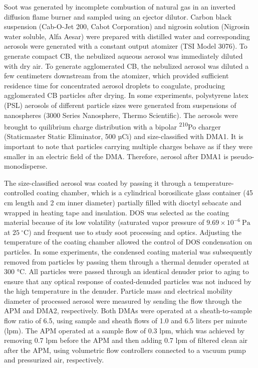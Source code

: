 Soot was generated by incomplete combustion of natural gas in an inverted diffusion flame burner \citep{RN43,RN44} and sampled using an ejector dilutor. Carbon black suspension (Cab-O-Jet 200, Cabot Corporation) and nigrosin solution (Nigrosin water soluble, Alfa Aesar) were prepared with distilled water and corresponding aerosols were generated with a constant output atomizer (TSI Model 3076). To generate compact CB, the nebulized aqueous aerosol was immediately diluted with dry air. To generate agglomerated CB, the nebulized aerosol was diluted a few centimeters downstream from the atomizer, which provided sufficient residence time for concentrated aerosol droplets to coagulate, producing agglomerated CB particles after drying. In some experiments, polystyrene latex (PSL) aerosols of different particle sizes were generated from suspensions of nanospheres (3000 Series Nanosphere, Thermo Scientific). The aerosols were brought to quilibrium charge distribution with a bipolar \textsuperscript{210}Po charger (Staticmaster Static Eliminator, 500 µCi) and size-classified with DMA1. It is important to note that particles carrying multiple charges behave as if they were smaller in an electric field of the DMA. Therefore, aerosol after DMA1 is pseudo-monodisperse.

The size-classified aerosol was coated by passing it through a temperature-controlled coating chamber, which is a cylindrical borosilicate glass container (45 cm length and 2 cm inner diameter) partially filled with dioctyl sebacate and wrapped in heating tape and insulation. DOS was selected as the coating material because of its low volatility (saturated vapor pressure of $9.69\times10^{-6}\ \mathrm{Pa}$ at $25\ \mathrm{^{\circ}C}$) and frequent use to study soot processing and optics.
Adjusting the temperature of the coating chamber allowed the control of DOS condensation on particles. In some experiments, the condensed coating material was subsequently removed from particles by passing them through a thermal denuder operated at 300 °C. All particles were passed through an identical denuder prior to aging to ensure that any optical response of coated-denuded particles was not induced by the high temperature in the denuder. Particle mass and electrical mobility diameter of processed aerosol were measured by sending the flow through the APM and DMA2, respectively. Both DMAs were operated at a sheath-to-sample flow ratio of 6.5, using sample and sheath flows of 1.0 and 6.5 liters per minute (lpm). The APM operated at a sample flow of 0.3 lpm, which was achieved by removing 0.7 lpm before the APM and then adding 0.7 lpm of filtered clean air after the APM, using volumetric flow controllers connected to a vacuum pump and pressurized air, respectively.

